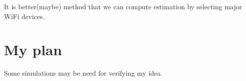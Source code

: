 \documentclass[12pt, onecolumn]{IEEEtran}
\begin{document}
It is better(maybe) method that we can compute estimation by selecting major WiFi devices. 


\section{My plan}
Some  simulations may be need for verifying my idea.  

%


\end{document}
